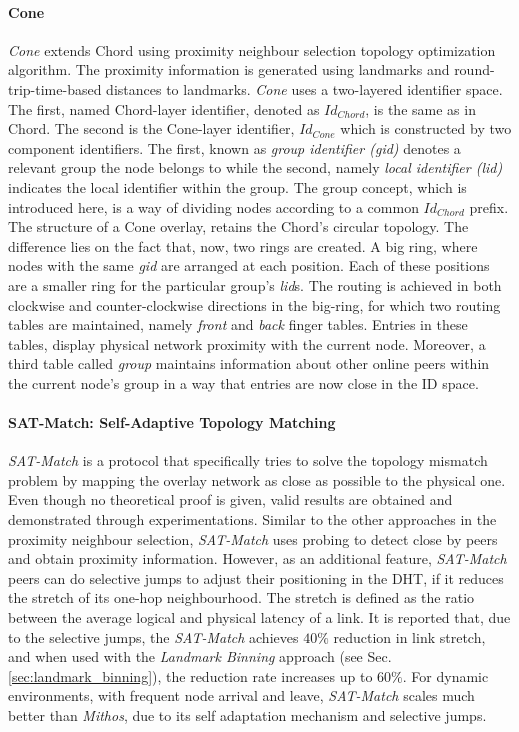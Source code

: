 \documentclass[acmcsur,acmnow]{acmtrans2m}
\begin{document}
\paragraph*{\bf Cone}

\textit{Cone}\cite{wang_cone_2007} extends Chord using proximity neighbour selection
topology optimization algorithm. The proximity information is generated using
landmarks and round-trip-time-based distances to landmarks.  \textit{Cone} uses a two-layered
identifier space. The first, named Chord-layer identifier, denoted as
$Id_{Chord}$, is the same as in Chord. The second is the Cone-layer
identifier, $Id_{Cone}$ which is constructed by two component identifiers. The
first, known as \emph{group identifier (gid)} denotes a relevant group the node
belongs to while the second, namely \emph{local identifier (lid)} indicates the
local identifier within the group. The group concept, which is introduced here,
is a way of dividing nodes according to a common $Id_{Chord}$ prefix.  The
structure of a Cone overlay, retains the Chord's circular topology. The difference
lies on the fact that, now, two rings are created. A big ring, where nodes with
the same \emph{gid} are arranged at each position. Each of these positions are a
smaller ring for the particular group's \emph{lid}s. The routing is achieved in
both clockwise and counter-clockwise directions in the big-ring, for which two
routing tables are maintained, namely \emph{front} and \emph{back} finger
tables. Entries in these tables, display physical network
proximity with the current node. Moreover, a third table called \emph{group}
maintains information about other online peers within the current node's
group in a way that entries are now close in the ID space.

\paragraph*{\bf SAT-Match: Self-Adaptive Topology Matching}

\textit{SAT-Match} \cite{ren_satmatch_2004} is a protocol that specifically
tries to solve the topology mismatch problem by mapping the overlay network as
close as possible to the physical one. Even though no theoretical proof is
given, valid results are obtained and demonstrated through experimentations.
Similar to the other approaches in the proximity neighbour selection,
\textit{SAT-Match} uses probing to detect close by peers and obtain proximity
information. However, as an additional feature, \textit{SAT-Match} peers can do
selective jumps to adjust their positioning in the DHT, if it reduces the stretch
of its one-hop neighbourhood. The stretch is defined as the ratio between the
average logical and physical latency of a link. It is reported that, due to the
selective jumps, the \textit{SAT-Match} achieves $40\%$ reduction in link
stretch, and when used with the \textit{Landmark Binning} approach (see Sec.
\ref{sec:landmark_binning}), the reduction rate increases up to $60\%$.
For dynamic environments, with frequent node arrival and leave,
\textit{SAT-Match} scales much better than \textit{Mithos}, due to its self
adaptation mechanism and selective jumps.
\end{document}
